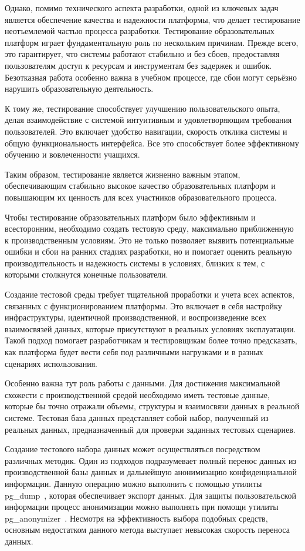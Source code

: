 Однако, помимо технического аспекта разработки, одной из ключевых задач является обеспечение качества и надежности платформы, что делает тестирование неотъемлемой частью процесса разработки. Тестирование образовательных платформ играет фундаментальную роль по нескольким причинам. Прежде всего, это гарантирует, что системы работают стабильно и без сбоев, предоставляя пользователям доступ к ресурсам и инструментам без задержек и ошибок. Безотказная работа особенно важна в учебном процессе, где сбои могут серьёзно нарушить образовательную деятельность.

К тому же, тестирование способствует улучшению пользовательского опыта, делая взаимодействие с системой интуитивным и удовлетворяющим требования пользователей. Это включает удобство навигации, скорость отклика системы и общую функциональность интерфейса. Все это способствует более эффективному обучению и вовлеченности учащихся.

Таким образом, тестирование является жизненно важным этапом, обеспечивающим стабильно высокое качество образовательных платформ и повышающим их ценность для всех участников образовательного процесса.

Чтобы тестирование образовательных платформ было эффективным и всесторонним, необходимо создать тестовую среду, максимально приближенную к производственным условиям. Это не только позволяет выявить потенциальные ошибки и сбои на ранних стадиях разработки, но и помогает оценить реальную производительность и надежность системы в условиях, близких к тем, с которыми столкнутся конечные пользователи.

Создание тестовой среды требует тщательной проработки и учета всех аспектов, связанных с функционированием платформы. Это включает в себя настройку инфраструктуры, идентичной производственной, и воспроизведение всех взаимосвязей данных, которые присутствуют в реальных условиях эксплуатации. Такой подход помогает разработчикам и тестировщикам более точно предсказать, как платформа будет вести себя под различными нагрузками и в разных сценариях использования.

Особенно важна тут роль работы с данными. Для достижения максимальной схожести с производственной средой необходимо иметь тестовые данные, которые бы точно отражали объемы, структуры и взаимосвязи данных в реальной системе. Тестовая база данных представляет собой набор, полученный из реальных данных, предназначенный для проверки заданных тестовых сценариев.

Создание тестового набора данных может осуществляться посредством различных методик. Один из подходов подразумевает полный перенос данных из производственной базы данных и дальнейшую анонимизацию конфиденциальной информации. Данную операцию можно выполнить с помощью утилиты pg\_dump~\cite{pg-dump}, которая обеспечивает экспорт данных. Для защиты пользовательской информации процесс анонимизации можно выполнять при помощи утилиты pg\_anonymizer~\cite{pg-anonymizer}. Несмотря на эффективность выбора подобных средств, основным недостатком данного метода выступает невысокая скорость переноса данных.

